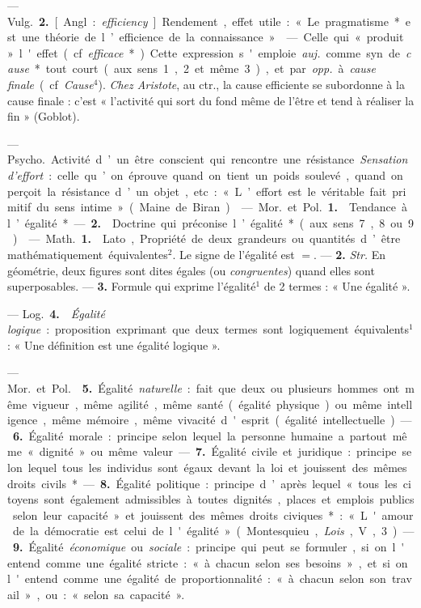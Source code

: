 \begin{itemize}[leftmargin=1cm, label=, itemsep=1pt]
— \si{Vulg.} {\bf 2.} [Angl. : {\it efficiency}].
Rendement, effet utile : « Le pragmatisme* est une théorie de
l’efficience de la connaissance. »

 — Celle qui « produit » l'effet (cf.
{\it efficace}*). Cette expression s'emploie  {\it auj.} comme
syn. de {\it cause}* tout court (aux
sens 1, 2 et même 3), et par {\it opp.}
à {\it cause finale} (cf. {\it Cause}$^4$). {\it Chez
Aristote}, au ctr., la cause efficiente
se subordonne à la cause finale :
c’est « l’activité qui sort du fond
même de l’être et tend à réaliser la fin » (Goblot).

 — \si{Psycho.} Activité d’un être
conscient qui rencontre une résistance. {\it Sensation d’effort} :
celle qu’on éprouve quand on tient un poids
soulevé, quand on perçoit la résistance d’un objet, etc. : « L’effort
est le véritable fait primitif du sens
intime » (Maine de Biran).

 — \si{Mor.} et \si{Pol.} {\bf 1.} 
Tendance à l’égalité*. — {\bf 2.}  Doctrine qui
préconise l’égalité* (aux sens 7, 8 ou 9).

 — \si{Math.} {\bf 1.}  Lato, Propriété
de deux grandeurs ou quantités
d’être mathématiquement équivalentes$^2$. Le signe de l'égalité est $=$.
— {\bf 2.}  {\it Str.} En géométrie, deux
figures sont dites égales (ou {\it congruentes}) quand elles sont
superposables. — {\bf 3.}  Formule qui exprime
l'égalité$^1$ de 2 termes : « Une égalité ».

— \si{Log.} {\bf 4.}  {\it Égalité logique} : proposition
exprimant que deux termes sont logiquement équivalents$^1$ :
« Une définition est une égalité logique ».

— \si{Mor.} et \si{Pol.}  {\bf 5.} Égalité {\it naturelle} : 
fait que deux ou plusieurs hommes ont même vigueur, même
agilité, même santé (égalité physique) ou même intelligence, même
mémoire, même vivacité d'esprit
(égalité intellectuelle). — {\bf 6.} Égalité
morale : principe selon lequel la personne humaine a partout même
« dignité » ou même valeur. — {\bf 7.}
Égalité civile et juridique : principe
selon lequel tous les individus sont
égaux devant la loi et jouissent des
mêmes droits civils*. — {\bf 8.} Égalité
politique : principe d’après lequel
« tous les citoyens sont également
admissibles à toutes dignités, places
et emplois publics selon leur capacité » et jouissent des mêmes droits
civiques* : « L'amour de la démocratie est celui de l'égalité »
(Montesquieu, {\it Lois}, V, 3). — {\bf 9.} Égalité
{\it économique} ou {\it sociale} : principe qui
peut se formuler, si on l'entend
comme une égalité stricte : « à
chacun selon ses besoins », et si on
l'entend comme une égalité de proportionnalité : « à chacun selon son
travail », ou : « selon sa capacité ».


\end{itemize}
